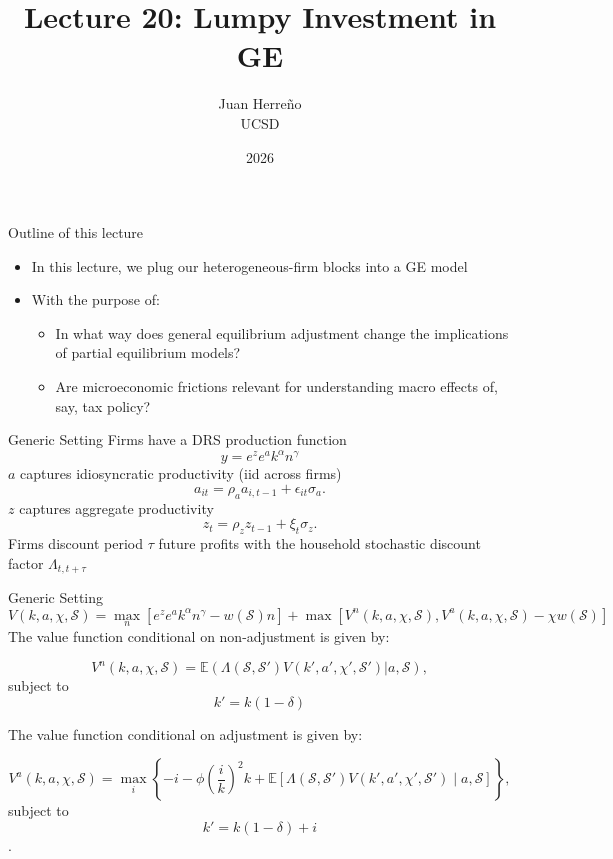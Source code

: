 \documentclass[11pt,aspectratio=169,xcolor={dvipsnames},hyperref={pdftex,pdfpagemode=UseNone,hidelinks,pdfdisplaydoctitle=true},usepdftitle=false]{beamer}
\title{Lecture 20: Lumpy Investment in GE}
\author{Juan Herre\~{n}o\\UCSD}
\date{2026}
\begin{document}
\maketitle

\begin{frame}{Outline of this lecture}
\begin{itemize}
\item In this lecture, we plug our heterogeneous-firm blocks into a GE model
\item With the purpose of:
\begin{itemize}
\item In what way does general equilibrium adjustment change the implications of partial equilibrium models?
\item Are microeconomic frictions relevant for understanding macro effects of, say, tax policy?
\end{itemize}
\end{itemize}
\end{frame}



\begin{frame}{Generic Setting}
Firms have a DRS production function
$$y = e^z e^{a} k^{\alpha} n^{\gamma}$$
$a$ captures idiosyncratic productivity (iid across firms)
$$a_{it} = \rho_a a_{i,t-1} + \epsilon_{it} \sigma_a.$$
$z$ captures aggregate productivity
$$z_{t} = \rho_z z_{t-1} + \xi_{t} \sigma_z.$$
Firms discount period $\tau$ future profits with the household stochastic discount factor $\Lambda_{t,t+\tau}$
\end{frame}


\begin{frame}{Generic Setting}
$$V(k,a,\chi,\mathcal{S}) = \max_n \left[e^z e^{a} k^{\alpha} n^{\gamma} - w(\mathcal{S}) n\right] + \max \left[V^n(k,a,\chi, \mathcal{S}),V^a(k,a,\chi,\mathcal{S}) - \chi w(\mathcal{S}) \right]$$ \vspace{-0.5cm}
The value function conditional on non-adjustment is given by:

$$V^n(k,a,\chi,\mathcal{S}) = \mathbb{E}(\Lambda(\mathcal{S},\mathcal{S'}) V(k',a',\chi',\mathcal{S'})|a,\mathcal{S}),$$ subject to $$k' = k(1-\delta)$$ \vspace{-0.5cm}

The value function conditional on adjustment is given by:

$$V^a(k,a,\chi,\mathcal{S}) = \max_i \left\{- i -\phi \left(\frac{i}{k}\right)^2 k +  \mathbb{E}\left[\Lambda(\mathcal{S},\mathcal{S'}) V(k',a',\chi',\mathcal{S'}) \mid a,\mathcal{S}\right]\right\},$$ subject to $$k' = k(1-\delta) + i$$. \vspace{-0.5cm}
\end{frame}
\end{document}
